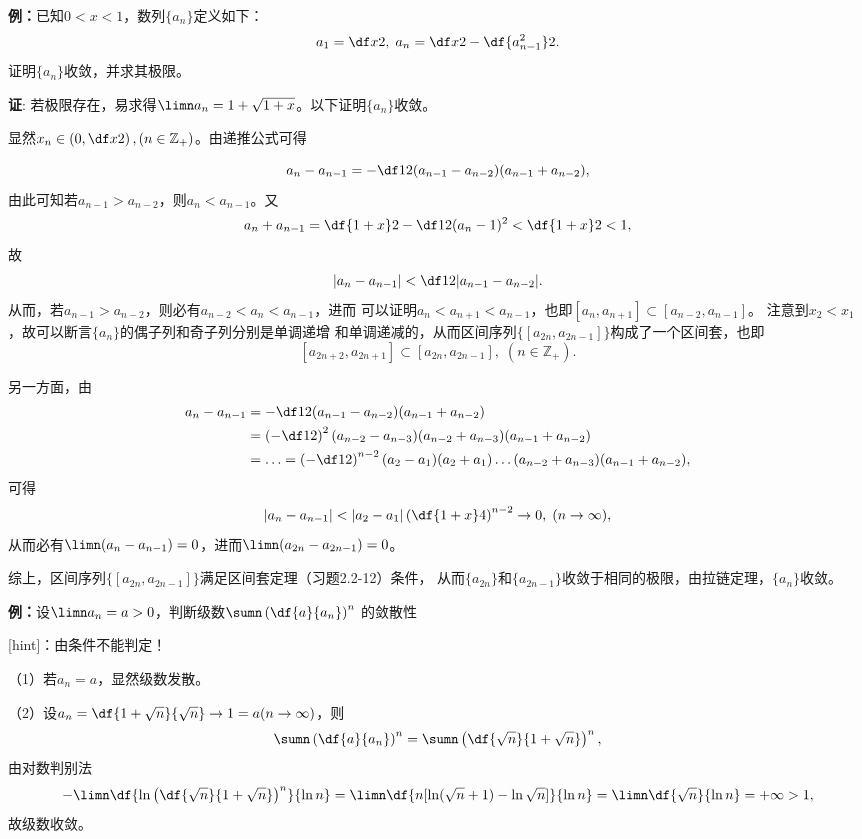{\bf 例：}已知$0<x<1$，数列$\{a_n\}$定义如下：
$$a_1=\df x2,\;a_n=\df x2-\df{a_{n-1}^2}2.$$
证明$\{a_n\}$收敛，并求其极限。

{\bf 证}: 若极限存在，易求得$\limn a_n=1+\sqrt{1+x}$。以下证明$\{a_n\}$收敛。

显然$x_n\in\left(0,\df x2\right),(n\in\mathbb Z_+)$。由递推公式可得


$$a_n-a_{n-1}=-\df12(a_{n-1}-a_{n-2})(a_{n-1}+a_{n-2}),$$
由此可知若$a_{n-1}>a_{n-2}$，则$a_n<a_{n-1}$。又
$$a_n+a_{n-1}=\df{1+x}2-\df12(a_n-1)^2<\df{1+x}2<1,$$
故
$$|a_n-a_{n-1}|<\df12|a_{n-1}-a_{n-2}|.$$
从而，若$a_{n-1}>a_{n-2}$，则必有$a_{n-2}<a_n<a_{n-1}$，进而
可以证明$a_n<a_{n+1}<a_{n-1}$，也即$[a_n,a_{n+1}]\subset[a_{n-2},a_{n-1}]$。
注意到$x_2<x_1$，故可以断言$\{a_n\}$的偶子列和奇子列分别是单调递增
和单调递减的，从而区间序列$\{[a_{2n},a_{2n-1}]\}$构成了一个区间套，也即
$$[a_{2n+2},a_{2n+1}]\subset[a_{2n},a_{2n-1}],\;(n\in\mathbb Z_+).$$

另一方面，由
\begin{align}
	a_n-a_{n-1}&=-\df12(a_{n-1}-a_{n-2})(a_{n-1}+a_{n-2})\notag\\
	&=\left(-\df12\right)^2(a_{n-2}-a_{n-3})(a_{n-2}+a_{n-3})(a_{n-1}+a_{n-2})\notag\\
	&=\ldots=\left(-\df12\right)^{n-2}(a_2-a_1)(a_2+a_1)\ldots
	(a_{n-2}+a_{n-3})(a_{n-1}+a_{n-2}),\notag
\end{align}
可得
$$|a_n-a_{n-1}|<|a_2-a_1|\left(\df{1+x}4\right)^{n-2}\to0,
\;(n\to\infty),$$
从而必有$\limn(a_n-a_{n-1})=0$，进而$\limn(a_{2n}-a_{2n-1})=0$。

综上，区间序列$\{[a_{2n},a_{2n-1}]\}$满足区间套定理（习题2.2-12）条件，
从而$\{a_{2n}\}$和$\{a_{2n-1}\}$收敛于相同的极限，由拉链定理，$\{a_n\}$收敛。

\newpage

{\bf 例：}设$\limn a_n=a>0$，判断级数$\sumn\left(\df{a}{a_n}\right)^n$
的敛散性

[hint]：由条件不能判定！

（1）若$a_n=a$，显然级数发散。

（2）设$a_n=\df{1+\sqrt n}{\sqrt n}\to1=a(n\to\infty)$，则
$$\sumn\left(\df{a}{a_n}\right)^n=\sumn\left(\df{\sqrt n}
{1+\sqrt n}\right)^n,$$
由对数判别法
$$-\limn\df{\ln \left(\df{\sqrt n}{1+\sqrt n}\right)^n}
{\ln n}=\limn\df{n[\ln(\sqrt n+1)-\ln\sqrt n]}{\ln n}
=\limn\df{\sqrt n}{\ln n}=+\infty>1,$$
故级数收敛。
